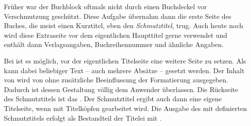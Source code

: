 \begin{Declaration}
\end{Declaration}%
\begin{Explain}%
  Früher war der Buchblock oftmals nicht durch einen Buchdeckel vor
  Verschmutzung geschützt. Diese Aufgabe übernahm dann die erste Seite des
  Buches, die meist einen Kurztitel, eben den \emph{Schmutztitel}, trug. Auch
  heute noch wird diese Extraseite vor dem eigentlichen Haupttitel gerne
  verwendet und enthält dann Verlagsangaben, Buchreihennummer und ähnliche
  Angaben.
\end{Explain}
Bei {\KOMAScript} ist es möglich, vor der eigentlichen Titelseite eine weitere
Seite zu setzen. Als  kann dabei
beliebiger Text -- auch mehrere Absätze -- gesetzt werden. Der Inhalt von
 wird von {\KOMAScript} ohne zusätzliche Beeinflussung der
Formatierung ausgegeben. Dadurch ist dessen Gestaltung völlig dem Anwender
überlassen. Die Rückseite%
des Schmutztitels ist das . Der Schmutztitel
ergibt auch dann eine eigene Titelseite, wenn mit Titelköpfen gearbeitet
wird. Die Ausgabe des mit  definierten Schmutztitels erfolgt
als Bestandteil der Titelei mit .

